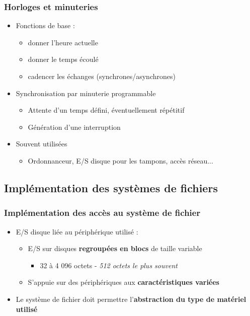 \begin{frame}
\frametitle{Horloges et minuteries}
\begin{itemize}
\item Fonctions de base :
\begin{itemize}
\item donner l'heure actuelle
\item donner le temps écoulé
\item cadencer les échanges (synchrones/asynchrones)
\end{itemize}
\item Synchronisation par minuterie programmable
\begin{itemize}
\item Attente d'un temps défini, éventuellement répétitif
\item Génération d'une interruption
\end{itemize}
\item Souvent utilisées
\begin{itemize}
\item Ordonnanceur, E/S disque pour les tampons, accès réseau...
\end{itemize}
\end{itemize}
\end{frame}



\subsection{Implémentation des systèmes de fichiers}

\begin{frame}
\frametitle{Implémentation des accès au système de fichier}
\begin{itemize}
\item E/S disque liée au périphérique utilisé :
\begin{itemize}
\item E/S sur disques\textbf{ regroupées en blocs} de taille variable
\begin{itemize}
\item 32 à 4 096 octets - \textit{512 octets le plus souvent}
\end{itemize}
\item S'appuie sur des périphériques aux \textbf{caractéristiques variées}
\end{itemize}
\item Le système de fichier doit permettre l'\textbf{abstraction du type de matériel utilisé}
\end{itemize}
\end{frame}

